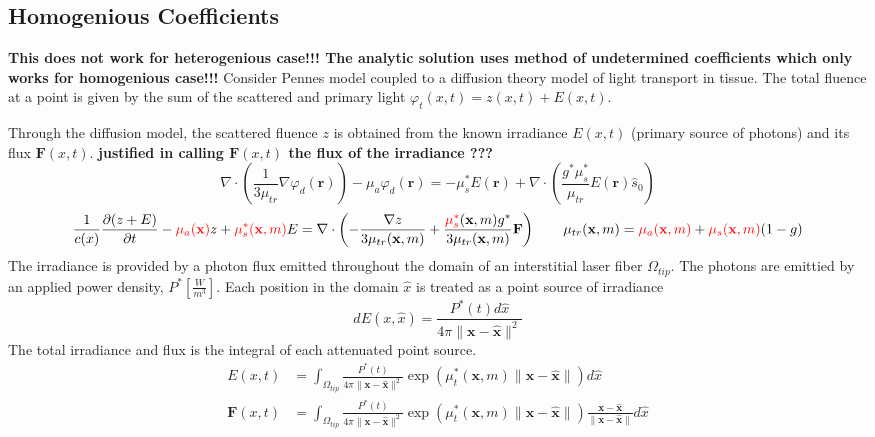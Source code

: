 \documentclass{article}         %
\theoremstyle{definition}
\theoremstyle{remark}
\begin{document}
\subsection{Homogenious Coefficients}
\cite{fuentesetal10a}
\textbf{
This does not work for heterogenious case!!!
The analytic solution uses method of undetermined coefficients
which only works for homogenious case!!!
}
Consider Pennes model coupled to a diffusion theory model of light
transport in tissue. The total fluence at a point is given by the
sum of the scattered and primary light $\varphi_t(x,t) = z(x,t) + E(x,t)$.

Through the diffusion model,
the scattered fluence $z$ is obtained from the 
known irradiance $E(x,t)$ (primary source of photons) 
and its flux $\textbf{F}(x,t)$.
\textbf{
justified in calling $\textbf{F}(x,t)$  the flux of the irradiance ???
}
\[
\nabla \cdot \left( \frac{1}{3 \mu_{tr} } \nabla \varphi_d(\mathbf{r}) \right)
 - \mu_a \varphi_d(\mathbf{r}) 
= 
- \mu_s^*  E(\mathbf{r})
+   \nabla \cdot \left( \frac{g^* \mu_s^*}{\mu_{tr}} E(\mathbf{r}) \hat{s}_0 \right)
\]
\[
 \frac{1}{c(x)}
 \frac{\partial(z+E)}{\partial t}
 -{\color{red}\mu_a(\textbf{x})} z 
 +{\color{red}\mu_s^*(\textbf{x},m)} E
 = \nabla \cdot 
   \left( 
   - \frac{ \nabla z }{3\mu_{tr}(\textbf{x},m)} 
   + \frac{ {\color{red}\mu_s^*}(\textbf{x},m) g^* }{3\mu_{tr}(\textbf{x},m)}
       \textbf{F}
   \right)
\qquad
  \mu_{tr}(\textbf{x},m)  = 
                 {\color{red}\mu_a(\textbf{x},m)} + 
                    {\color{red}\mu_s(\textbf{x},m)} (1-g)
\]
The irradiance is provided by a photon flux emitted throughout
the domain of an interstitial laser fiber $\Omega_{tip}$.
The photons are emittied by an applied power density,
$P^* \left[\frac{W}{m^3}\right]$. Each position in the domain $\hat{x}$
is treated as a point source of irradiance
\[
dE(x,\hat{x})= 
             \frac{P^*(t)d\hat{x}}{4\pi \|\textbf{x} -
\hat{\textbf{x}}\|^2}
\]
The total irradiance and flux is the integral of each attenuated point source.
\[
\begin{split}
E(x,t) & = \int_{\Omega_{tip}} 
             \frac{P^*(t)}{4\pi \|\textbf{x} - \hat{\textbf{x}}\|^2}
             \exp\left(\mu_t^*(\textbf{x},m)
                         \|\textbf{x} - \hat{\textbf{x}}\|\right) d\hat{x}
 \\
\textbf{F}(x,t) & = \int_{\Omega_{tip}} 
             \frac{P^*(t)}{4\pi \|\textbf{x} - \hat{\textbf{x}}\|^2}
             \exp\left(\mu_t^*(\textbf{x},m) 
                         \|\textbf{x} - \hat{\textbf{x}}\|\right) 
\frac{\textbf{x} - \hat{\textbf{x}} }{ \|\textbf{x} - \hat{\textbf{x}}\| }
d\hat{x}
\end{split} 
\]
\end{document}

